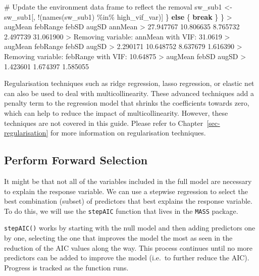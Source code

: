 \documentclass[
  letterpaper,
]{book}
\newenvironment{Shaded}{\begin{snugshade}}{\end{snugshade}}
\newcommand{\CommentTok}[1]{\textcolor[rgb]{0.37,0.37,0.37}{#1}}
\newcommand{\ControlFlowTok}[1]{\textcolor[rgb]{0.00,0.23,0.31}{\textbf{#1}}}
\newcommand{\FloatTok}[1]{\textcolor[rgb]{0.68,0.00,0.00}{#1}}
\newcommand{\FunctionTok}[1]{\textcolor[rgb]{0.28,0.35,0.67}{#1}}
\newcommand{\NormalTok}[1]{\textcolor[rgb]{0.00,0.23,0.31}{#1}}
\newcommand{\OtherTok}[1]{\textcolor[rgb]{0.00,0.23,0.31}{#1}}
\newcommand{\SpecialCharTok}[1]{\textcolor[rgb]{0.37,0.37,0.37}{#1}}
\begin{document}
\begin{Shaded}
\begin{Highlighting}[]
    \CommentTok{\# Update the environment data frame to reflect the removal}
\NormalTok{    sw\_sub1 }\OtherTok{\textless{}{-}}\NormalTok{ sw\_sub1[, }\SpecialCharTok{!}\NormalTok{(}\FunctionTok{names}\NormalTok{(sw\_sub1) }\SpecialCharTok{\%in\%}\NormalTok{ high\_vif\_var)]}
\NormalTok{  \} }\ControlFlowTok{else}\NormalTok{ \{}
    \ControlFlowTok{break}
\NormalTok{  \}}
\NormalTok{\}}
\SpecialCharTok{\textgreater{}}\NormalTok{   augMean  febRange     febSD     augSD   annMean }
\SpecialCharTok{\textgreater{}} \FloatTok{27.947767} \FloatTok{10.806635}  \FloatTok{8.765732}  \FloatTok{2.497739} \FloatTok{31.061900} 
\SpecialCharTok{\textgreater{}}\NormalTok{ Removing variable}\SpecialCharTok{:}\NormalTok{ annMean with VIF}\SpecialCharTok{:} \FloatTok{31.0619} 
\SpecialCharTok{\textgreater{}}\NormalTok{   augMean  febRange     febSD     augSD }
\SpecialCharTok{\textgreater{}}  \FloatTok{2.290171} \FloatTok{10.648752}  \FloatTok{8.637679}  \FloatTok{1.616390} 
\SpecialCharTok{\textgreater{}}\NormalTok{ Removing variable}\SpecialCharTok{:}\NormalTok{ febRange with VIF}\SpecialCharTok{:} \FloatTok{10.64875} 
\SpecialCharTok{\textgreater{}}\NormalTok{  augMean    febSD    augSD }
\SpecialCharTok{\textgreater{}} \FloatTok{1.423601} \FloatTok{1.674397} \FloatTok{1.585055}
\end{Highlighting}
\end{Shaded}

Regularisation techniques such as ridge regression, lasso regression, or
elastic net can also be used to deal with multicollinearity. These
advanced techniques add a penalty term to the regression model that
shrinks the coefficients towards zero, which can help to reduce the
impact of multicollinearity. However, these techniques are not covered
in this guide. Please refer to Chapter~\ref{sec-regularisation} for more
information on regularisation techniques.

\subsection{Perform Forward Selection}\label{sec-forward-selection}

It might be that not all of the variables included in the full model are
necessary to explain the response variable. We can use a stepwise
regression to select the best combination (subset) of predictors that
best explains the response variable. To do this, we will use the
\texttt{stepAIC} function that lives in the \texttt{MASS} package.

\texttt{stepAIC()} works by starting with the null model and then adding
predictors one by one, selecting the one that improves the model the
most as seen in the reduction of the AIC values along the way. This
process continues until no more predictors can be added to improve the
model (i.e.~to further reduce the AIC). Progress is tracked as the
function runs.
\end{document}
